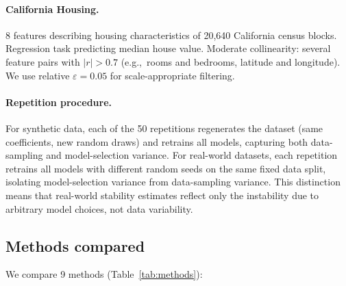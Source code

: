 \documentclass[10pt]{article}
\newcommand{\eg}{e.g.,\ }
\begin{document}
\paragraph{California Housing.}
8 features describing housing characteristics of 20,640 California
census blocks. Regression task predicting median house value. Moderate
collinearity: several feature pairs with $|r| > 0.7$ (\eg rooms and
bedrooms, latitude and longitude).
We use relative $\varepsilon = 0.05$ for scale-appropriate filtering.

\paragraph{Repetition procedure.}
For synthetic data, each of the 50 repetitions regenerates the dataset
(same coefficients, new random draws) and retrains all models, capturing
both data-sampling and model-selection variance. For real-world datasets,
each repetition retrains all models with different random seeds on the
same fixed data split, isolating model-selection variance from
data-sampling variance. This distinction means that real-world stability
estimates reflect only the instability due to arbitrary model choices,
not data variability.

\subsection{Methods compared}

We compare 9 methods (Table~\ref{tab:methods}):
\end{document}
